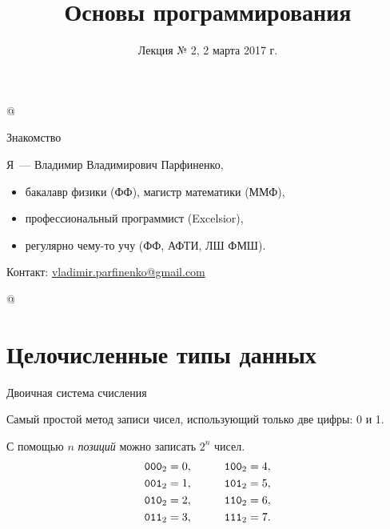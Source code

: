 %





\title{Основы программирования}
\subtitle{Лекция № 2, 2 марта 2017 г.}
\date{}




\lstMakeShortInline[style=inlineC]@

\begin{frame}[plain]
  \titlepage
\end{frame}

\lstDeleteShortInline@
\begin{frame}{Знакомство}

  Я~--- Владимир Владимирович Парфиненко,

  \begin{itemize}
    \item бакалавр физики (ФФ), магистр математики (ММФ),
    \item профессиональный программист (Excelsior),
    \item регулярно чему-то учу (ФФ, АФТИ, ЛШ ФМШ).
  \end{itemize}


  Контакт:
  \href{mailto:vladimir.parfinenko@gmail.com}{vladimir.parfinenko@gmail.com}

\end{frame}
\lstMakeShortInline[style=inlineC]@

\section{Целочисленные типы данных}

\begin{frame}{Двоичная система счисления}

  Самый простой метод записи чисел, использующий только две цифры: 0 и 1.

  С помощью $n$ \emph{позиций} можно записать $2^n$ чисел.
  \begin{align*}
    \mathtt{000}_2 &= 0, &\qquad \mathtt{100}_2 &= 4, \\
    \mathtt{001}_2 &= 1, &\qquad \mathtt{101}_2 &= 5, \\
    \mathtt{010}_2 &= 2, &\qquad \mathtt{110}_2 &= 6, \\
    \mathtt{011}_2 &= 3, &\qquad \mathtt{111}_2 &= 7.
  \end{align*}

\end{frame}

